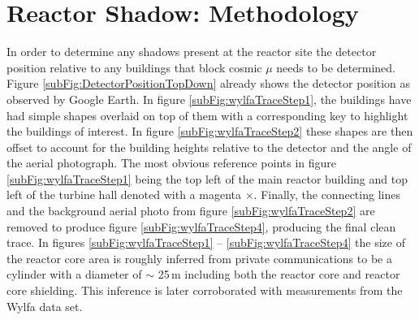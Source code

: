 
\section{Reactor Shadow: Methodology} \label{sec:ReactorShadowMethodology}
In order to determine any shadows present at the reactor site the detector position relative to any buildings that block cosmic $\mu$ needs to be determined. Figure \ref{subFig:DetectorPositionTopDown} already shows the detector position as observed by Google Earth. In figure \ref{subFig:wylfaTraceStep1}, the buildings have had simple shapes overlaid on top of them with a corresponding key to highlight the buildings of interest. In figure \ref{subFig:wylfaTraceStep2} these shapes are then offset to account for the building heights relative to the detector and the angle of the aerial photograph. The most obvious reference points in figure \ref{subFig:wylfaTraceStep1} being the top left of the main reactor building and top left of the turbine hall denoted with a magenta $\times$. Finally, the connecting lines and the background aerial photo from figure \ref{subFig:wylfaTraceStep2} are removed to produce figure \ref{subFig:wylfaTraceStep4}, producing the final clean trace. In figures \ref{subFig:wylfaTraceStep1}  -- \ref{subFig:wylfaTraceStep4} the size of the reactor core area is roughly inferred from private communications to be a cylinder with a diameter of $\sim$ 25\,m including both the reactor core and reactor core shielding. This inference is later corroborated with measurements from the Wylfa data set. 


